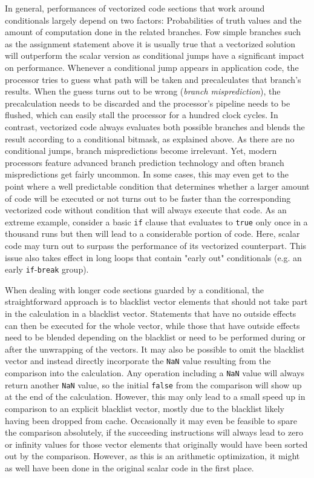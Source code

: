 In general, performances of vectorized code sections that work around conditionals largely depend on two factors: Probabilities of truth values and the amount of computation done in the related branches. Fow simple branches such as the assignment statement above it is usually true that a vectorized solution will outperform the scalar version as conditional jumps have a significant impact on performance. Whenever a conditional jump appears in application code, the processor tries to guess what path will be taken and precalculates that branch's results. When the guess turns out to be wrong (\emph{branch misprediction}), the precalculation needs to be discarded and the processor's pipeline needs to be flushed, which can easily stall the processor for a hundred clock cycles. In contrast, vectorized code always evaluates both possible branches and blends the result according to a conditional bitmask, as explained above. As there are no conditional jumps, branch mispredictions become irrelevant. Yet, modern processors feature advanced branch prediction technology and often branch mispredictions get fairly uncommon. In some cases, this may even get to the point where a well predictable condition that determines whether a larger amount of code will be executed or not turns out to be faster than the corresponding vectorized code without condition that will always execute that code. As an extreme example, consider a basic \texttt{if} clause that evaluates to \texttt{true} only once in a thousand runs but then will lead to a considerable portion of code. Here, scalar code may turn out to surpass the performance of its vectorized counterpart. This issue also takes effect in long loops that contain "early out" conditionals (e.g. an early \texttt{if}-\texttt{break} group). 

When dealing with longer code sections guarded by a conditional, the straightforward approach is to blacklist vector elements that should not take part in the calculation in a blacklist vector. Statements that have no outside effects can then be executed for the whole vector, while those that have outside effects need to be blended depending on the blacklist or need to be performed during or after the unwrapping of the vectors. It may also be possible to omit the blacklist vector and instead directly incorporate the \texttt{NaN} value resulting from the comparison into the calculation. Any operation including a \texttt{NaN} value will always return another \texttt{NaN} value, so the initial \texttt{false} from the comparison will show up at the end of the calculation. However, this may only lead to a small speed up in comparison to an explicit blacklist vector, mostly due to the blacklist likely having been dropped from cache. Occasionally it may even be feasible to spare the comparison absolutely, if the succeeding instructions will always lead to zero or infinity values for those vector elements that originally would have been sorted out by the comparison. However, as this is an arithmetic optimization, it might as well have been done in the original scalar code in the first place.

